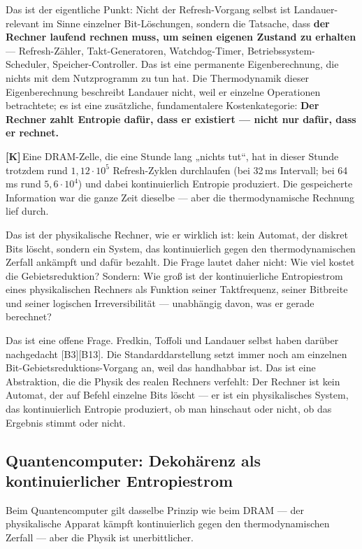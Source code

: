 \documentclass[11pt,a4paper]{article}
\newcommand{\LK}{\textcolor{layK}{\textbf{\footnotesize\textsf{[K]}}}\,}
\begin{document}
Das ist der eigentliche Punkt: Nicht der Refresh-Vorgang selbst ist
Landauer-relevant im Sinne einzelner Bit-Löschungen, sondern die Tatsache, dass
\textbf{der Rechner laufend rechnen muss, um seinen eigenen Zustand zu erhalten}
--- Refresh-Zähler, Takt-Generatoren, Watchdog-Timer,
Betriebssystem-Scheduler, Speicher-Controller. Das ist eine permanente
Eigenberechnung, die nichts mit dem Nutzprogramm zu tun hat. Die Thermodynamik
dieser Eigenberechnung beschreibt Landauer nicht, weil er einzelne Operationen
betrachtete; es ist eine zusätzliche, fundamentalere Kostenkategorie:
\textbf{Der Rechner zahlt Entropie dafür, dass er existiert --- nicht nur dafür,
dass er rechnet.}

\LK Eine DRAM-Zelle, die eine Stunde lang „nichts tut“, hat in dieser Stunde
trotzdem rund $1{,}12\cdot10^{5}$ Refresh-Zyklen durchlaufen (bei 32\,ms
Intervall; bei 64\,ms rund $5{,}6\cdot10^{4}$) und dabei kontinuierlich Entropie
produziert. Die gespeicherte Information war die ganze Zeit dieselbe --- aber die
thermodynamische Rechnung lief durch.

Das ist der physikalische Rechner, wie er wirklich ist: kein Automat, der diskret
Bits löscht, sondern ein System, das kontinuierlich gegen den thermodynamischen
Zerfall ankämpft und dafür bezahlt. Die Frage lautet daher nicht: Wie viel kostet
die Gebietsreduktion? Sondern: Wie groß ist der kontinuierliche Entropiestrom
eines physikalischen Rechners als Funktion seiner Taktfrequenz, seiner Bitbreite
und seiner logischen Irreversibilität --- unabhängig davon, was er gerade
berechnet?

Das ist eine offene Frage. Fredkin, Toffoli und Landauer selbst haben darüber
nachgedacht [B3][B13]. Die Standarddarstellung setzt immer noch am einzelnen
Bit-Gebietsreduktions-Vorgang an, weil das handhabbar ist. Das ist eine
Abstraktion, die die Physik des realen Rechners verfehlt: Der Rechner ist kein
Automat, der auf Befehl einzelne Bits löscht --- er ist ein physikalisches System,
das kontinuierlich Entropie produziert, ob man hinschaut oder nicht, ob das
Ergebnis stimmt oder nicht.

\subsection{Quantencomputer: Dekohärenz als kontinuierlicher Entropiestrom}

Beim Quantencomputer gilt dasselbe Prinzip wie beim DRAM --- der physikalische
Apparat kämpft kontinuierlich gegen den thermodynamischen Zerfall --- aber die
Physik ist unerbittlicher.
\end{document}
